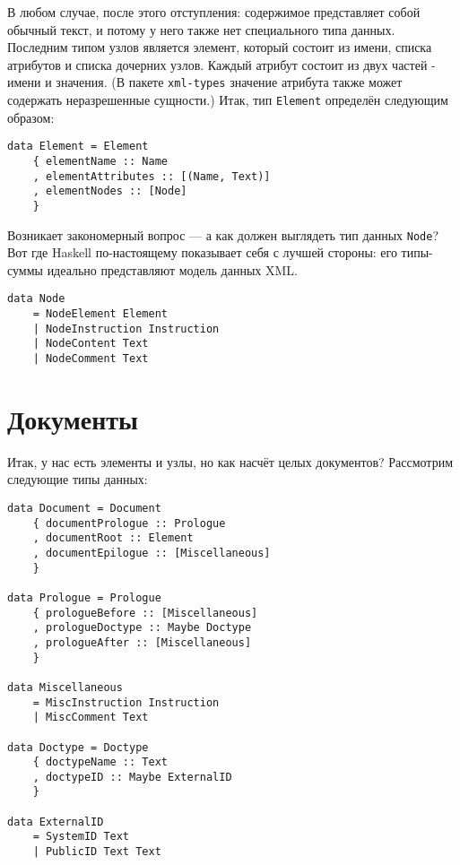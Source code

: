 В любом случае, после этого отступления: содержимое представляет собой обычный текст, и потому у него также нет специального типа данных. Последним типом узлов является элемент, который состоит из имени, списка атрибутов и списка дочерних узлов. Каждый атрибут состоит из двух частей - имени и значения. (В пакете \lstinline!xml-types! значение атрибута также может содержать неразрешенные сущности.) Итак, тип \lstinline!Element! определён следующим образом:

\begin{lstlisting}
data Element = Element
    { elementName :: Name
    , elementAttributes :: [(Name, Text)]
    , elementNodes :: [Node]
    }
\end{lstlisting}

Возникает закономерный вопрос --- а как должен выглядеть тип данных \lstinline!Node!? Вот где Haskell по-настоящему показывает себя с лучшей стороны: его типы-суммы идеально представляют модель данных XML. %

\begin{lstlisting}
data Node
    = NodeElement Element
    | NodeInstruction Instruction
    | NodeContent Text
    | NodeComment Text
\end{lstlisting}

\section{Документы} %

Итак, у нас есть элементы и узлы, но как насчёт целых документов? Рассмотрим следующие типы данных:

\begin{lstlisting}
data Document = Document
    { documentPrologue :: Prologue
    , documentRoot :: Element
    , documentEpilogue :: [Miscellaneous]
    }

data Prologue = Prologue
    { prologueBefore :: [Miscellaneous]
    , prologueDoctype :: Maybe Doctype
    , prologueAfter :: [Miscellaneous]
    }

data Miscellaneous
    = MiscInstruction Instruction
    | MiscComment Text

data Doctype = Doctype
    { doctypeName :: Text
    , doctypeID :: Maybe ExternalID
    }

data ExternalID
    = SystemID Text
    | PublicID Text Text
\end{lstlisting}

